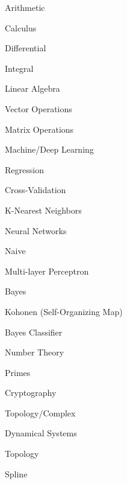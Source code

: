 
\begin{DoxyEnumerate}
\item Arithmetic
\item Calculus
\begin{DoxyItemize}
\item Differential
\item Integral
\end{DoxyItemize}
\item Linear Algebra
\begin{DoxyItemize}
\item Vector Operations
\item Matrix Operations
\end{DoxyItemize}
\item Machine/\+Deep Learning
\begin{DoxyItemize}
\item Regression
\item Cross-\/\+Validation
\item K-\/\+Nearest Neighbors
\item Neural Networks
\begin{DoxyItemize}
\item Naive
\item Multi-\/layer Perceptron
\item Bayes
\item Kohonen (Self-\/\+Organizing Map)
\end{DoxyItemize}
\item Bayes Classifier
\end{DoxyItemize}
\item Number Theory
\begin{DoxyItemize}
\item Primes
\item Cryptography
\end{DoxyItemize}
\item Topology/\+Complex
\begin{DoxyItemize}
\item Dynamical Systems
\item Topology
\item Spline 
\end{DoxyItemize}
\end{DoxyEnumerate}